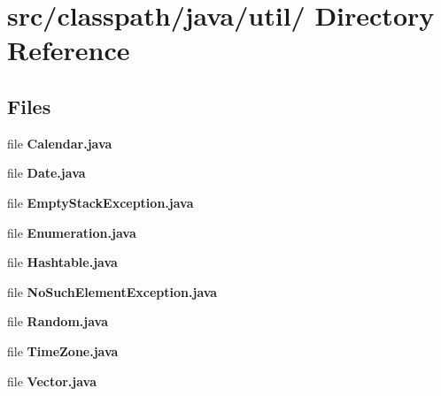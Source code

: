 \section{src/classpath/java/util/ Directory Reference}
\label{dir_7e69729458ed89140a86a082c72188f5}
\subsection*{Files}
\begin{DoxyCompactItemize}
\item 
file {\bfseries Calendar.java}
\item 
file {\bfseries Date.java}
\item 
file {\bfseries EmptyStackException.java}
\item 
file {\bfseries Enumeration.java}
\item 
file {\bfseries Hashtable.java}
\item 
file {\bfseries NoSuchElementException.java}
\item 
file {\bfseries Random.java}
\item 
file {\bfseries TimeZone.java}
\item 
file {\bfseries Vector.java}
\end{DoxyCompactItemize}
